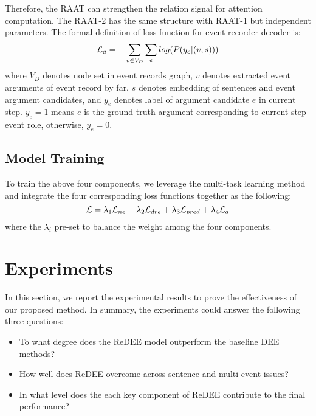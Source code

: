 \documentclass[11pt]{article}
\begin{document}
Therefore, the RAAT can strengthen the relation signal for attention computation. The RAAT-2 has the same structure with RAAT-1 but independent parameters. The formal definition of loss function for event recorder decoder is:
\begin{equation}
\small
    \mathcal{L}_a= -\sum_{v \in V_D}\sum_elog(P(y_e|(v, s)))
\end{equation}
where $V_D$ denotes node set in event records graph, $v$ denotes extracted event arguments of event record by far, $s$ denotes embedding of sentences and event argument candidates, and $y_e$ denotes label of argument candidate $e$ in current step. $y_e = 1$ means $e$ is the ground truth argument corresponding to current step event role, otherwise, $y_e = 0$.


\subsection{Model Training}

To train the above four components, we leverage the multi-task learning method \cite{Ronan-multi-task} and integrate the four corresponding loss functions together as the following: 
\begin{equation}
\small
    \mathcal{L} = \lambda_1\mathcal{L}_{ne} + \lambda_2\mathcal{L}_{dre} + \lambda_3\mathcal{L}_{pred} + \lambda_4\mathcal{L}_{a}
\end{equation}
where the $\lambda_i$ pre-set to balance the weight among the four components. 

\section{Experiments}

In this section, we report the experimental results to prove the effectiveness of our proposed method. In summary, the experiments could answer the following three questions:
\begin{itemize}
    \item To what degree does the ReDEE model outperform the baseline DEE methods?
    \item How well does ReDEE overcome across-sentence and multi-event issues?
    \item In what level does the each key component of ReDEE contribute to the final performance?
\end{itemize}
\end{document}
